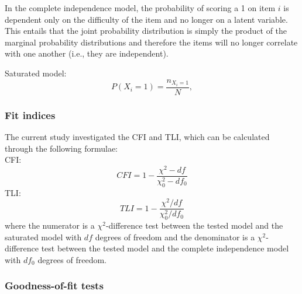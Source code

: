 \documentclass[Royal,sageapa,times,doublespace]{sagej}
\begin{document}
In the complete independence model, the probability of scoring a 1 on item $i$ is dependent only on the difficulty of the item and no longer on
a latent variable. This entails that the joint probability distribution is simply the product of the marginal probability distributions and therefore the
items will no longer correlate with one another (i.e., they are independent).

Saturated model:
\begin{equation}
P(X_i = 1) = \frac{n_{X_i = 1}}{N},
\end{equation}
\subsubsection{Fit indices} 
The current study investigated the CFI and TLI, which can be calculated through the following formulae: \\

CFI:
\begin{equation}
CFI = 1 - \frac{\chi^{2} - df}{\chi^{2}_{0} - df_0}
\end{equation}
TLI:
\begin{equation}
TLI = 1 - \frac{\chi^{2}/df}{\chi^{2}_{0}/df_0}
\end{equation}
where the numerator is a $\chi^2$-difference test between the tested model and the saturated model with $df$ degrees of freedom 
and the denominator is a $\chi^2$-difference test between the tested model and the complete independence model with $df_0$ degrees of freedom.

\subsubsection{Goodness-of-fit tests}
\end{document}

